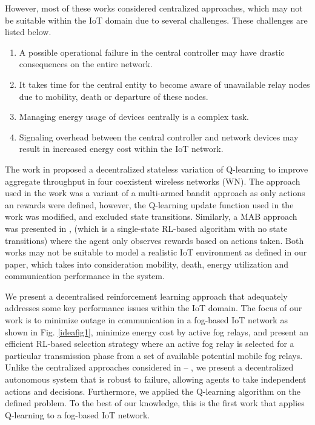 \documentclass[journal]{IEEEtran}
\begin{document}
However, most of these works considered centralized approaches, which may not be suitable within the IoT domain due to several challenges. These challenges are listed below.
\begin{enumerate}
  \item A possible operational failure in the central controller may have drastic consequences on the entire network.
  \item It takes time for the central entity to become aware of unavailable relay nodes due to mobility, death or departure of these nodes.
  \item Managing energy usage of devices centrally is a complex task.
  \item Signaling overhead between the central controller and network devices may result in increased energy cost within the IoT network.
\end{enumerate}

The work in \cite{Wilhelmi2017} proposed a decentralized stateless variation of Q-learning to improve aggregate throughput in four coexistent wireless networks (WN). The approach used in the work was a variant of a multi-armed bandit approach as only actions an rewards were defined, however, the Q-learning update function used in the work was modified, and excluded state transitions. Similarly, a MAB approach was presented in \cite{Azari2018}, (which is a single-state RL-based algorithm with no state transitions) where the agent only observes rewards based on actions taken. Both works may not be suitable to model a realistic IoT environment as defined in our paper, which takes into consideration mobility, death, energy utilization and communication performance in the system.

We present a decentralised reinforcement learning approach that adequately addresses some key performance issues within the IoT domain. The focus of our work is to minimize outage in communication in a fog-based IoT network as shown in Fig. \ref{ideafig1}, minimize energy cost by active fog relays, and present an efficient RL-based selection strategy where an active fog relay is selected for a particular transmission phase from a set of available potential mobile fog relays. Unlike the centralized approaches considered in \cite{OmoniwaRelay2018} -- \cite{Behdad2018}, we present a decentralized autonomous system that is robust to failure, allowing agents to take independent actions and decisions.
Furthermore, we applied the Q-learning algorithm on the defined problem. To the best of our knowledge, this is the first work that applies Q-learning to a fog-based IoT network.
\end{document}
